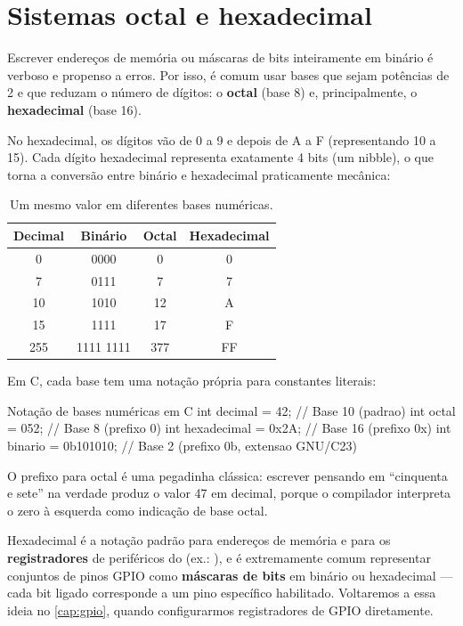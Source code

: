 \section{Sistemas octal e hexadecimal}

Escrever endereços de memória ou máscaras de bits inteiramente em binário é verboso e propenso a erros. Por isso, é comum usar bases que sejam potências de 2 e que reduzam o número de dígitos: o \textbf{octal} (base 8) e, principalmente, o \textbf{hexadecimal} (base 16).

No hexadecimal, os dígitos vão de 0 a 9 e depois de A a F (representando 10 a 15). Cada dígito hexadecimal representa exatamente 4 bits (um nibble), o que torna a conversão entre binário e hexadecimal praticamente mecânica:

\begin{table}[h]
\centering
\begin{tabular}{@{}cccc@{}}
\toprule
\textbf{Decimal} & \textbf{Binário} & \textbf{Octal} & \textbf{Hexadecimal} \\
\midrule
0  & 0000 & 0  & 0 \\
7  & 0111 & 7  & 7 \\
10 & 1010 & 12 & A \\
15 & 1111 & 17 & F \\
255 & 1111 1111 & 377 & FF \\
\bottomrule
\end{tabular}
\caption{Um mesmo valor em diferentes bases numéricas.}
\end{table}

Em C, cada base tem uma notação própria para constantes literais:

\begin{codigoc}{Notação de bases numéricas em C}
int decimal     = 42;        // Base 10 (padrao)
int octal       = 052;       // Base 8  (prefixo 0)
int hexadecimal = 0x2A;      // Base 16 (prefixo 0x)
int binario     = 0b101010;  // Base 2  (prefixo 0b, extensao GNU/C23)
\end{codigoc}

\begin{atencao}
O prefixo  para octal é uma pegadinha clássica: escrever  pensando em ``cinquenta e sete'' na verdade produz o valor 47 em decimal, porque o compilador interpreta o zero à esquerda como indicação de base octal.
\end{atencao}

\begin{esp32box}
Hexadecimal é a notação padrão para endereços de memória e para os \textbf{registradores} de periféricos do \ESP{} (ex.: ), e é extremamente comum representar conjuntos de pinos GPIO como \textbf{máscaras de bits} em binário ou hexadecimal — cada bit ligado corresponde a um pino específico habilitado. Voltaremos a essa ideia no \cref{cap:gpio}, quando configurarmos registradores de GPIO diretamente.
\end{esp32box}

